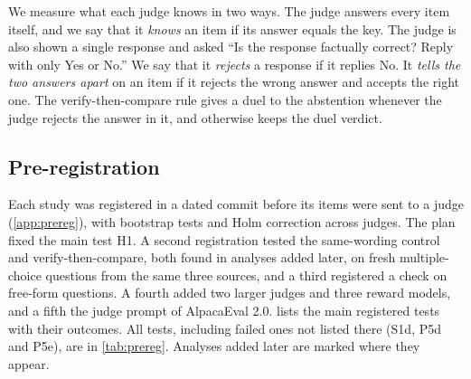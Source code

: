 \documentclass[11pt,letterpaper]{article}
\begin{document}
We measure what each judge knows in two ways. The judge answers every item itself, and we say that it \emph{knows} an item if its answer equals the key. The judge is also shown a single response and asked ``Is the response factually correct? Reply with only Yes or No.'' We say that it \emph{rejects} a response if it replies No. It \emph{tells the two answers apart} on an item if it rejects the wrong answer and accepts the right one. The verify-then-compare rule gives a duel to the abstention whenever the judge rejects the answer in it, and otherwise keeps the duel verdict.

\subsection*{Pre-registration}

Each study was registered in a dated commit before its items were sent to a judge (\cref{app:prereg}), with bootstrap tests and Holm correction across judges. The plan fixed the main test H1. A second registration tested the same-wording control and verify-then-compare, both found in analyses added later, on \cfQuestions{} fresh multiple-choice questions from the same three sources, and a third registered a check on \ffQuestions{} free-form questions. A fourth added two larger judges and three reward models, and a fifth the judge prompt of AlpacaEval 2.0.
 lists the main registered tests with their outcomes. All tests, including failed ones not listed there (S1d, P5d and P5e), are in \cref{tab:prereg}. Analyses added later are marked where they appear.
\end{document}
